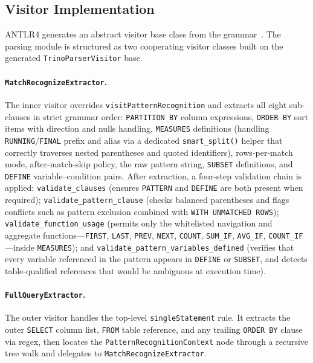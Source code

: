 \subsection{Visitor Implementation}
\label{subsec:meth-visitor}

ANTLR4 generates an abstract visitor base class from the grammar~\cite{robson2022designpatterns}.
The parsing module is structured as two cooperating visitor classes
built on the generated \texttt{TrinoParserVisitor} base.

\paragraph{\texttt{MatchRecognizeExtractor}.}
The inner visitor overrides \texttt{visitPatternRecognition}
and extracts all eight sub-clauses in strict grammar order:
\texttt{PARTITION~BY} column expressions,
\texttt{ORDER~BY} sort items with direction and nulls handling,
\texttt{MEASURES} definitions (handling \texttt{RUNNING}/\texttt{FINAL}
prefix and alias via a dedicated \texttt{smart\_split()} helper that
correctly traverses nested parentheses and quoted identifiers),
rows-per-match mode, after-match-skip policy, the raw pattern string,
\texttt{SUBSET} definitions, and \texttt{DEFINE} variable--condition
pairs.  After extraction, a four-step validation chain is applied:
\texttt{validate\_clauses} (ensures \texttt{PATTERN}
and \texttt{DEFINE} are both present when required);
\texttt{validate\_pattern\_clause} (checks balanced parentheses and
flags conflicts such as pattern exclusion combined with
\texttt{WITH UNMATCHED ROWS});
\texttt{validate\_function\_usage} (permits only the whitelisted
navigation and aggregate functions---\texttt{FIRST}, \texttt{LAST},
\texttt{PREV}, \texttt{NEXT}, \texttt{COUNT}, \texttt{SUM\_IF},
\texttt{AVG\_IF}, \texttt{COUNT\_IF}---inside \texttt{MEASURES});
and \texttt{validate\_pattern\_variables\_defined} (verifies that
every variable referenced in the pattern appears in \texttt{DEFINE} or
\texttt{SUBSET}, and detects table-qualified references that would be
ambiguous at execution time).

\paragraph{\texttt{FullQueryExtractor}.}
The outer visitor handles the top-level \texttt{singleStatement}
rule.  It extracts the outer \texttt{SELECT} column list, \texttt{FROM}
table reference, and any trailing \texttt{ORDER~BY} clause via regex,
then locates the \texttt{PatternRecognitionContext} node through a
recursive tree walk and delegates to \texttt{MatchRecognizeExtractor}.

